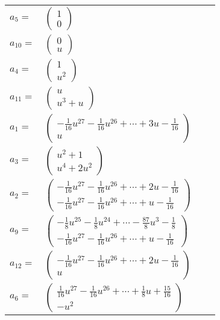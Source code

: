 \documentclass[1p]{elsarticle_modified}
\theoremstyle{definition}
\begin{document}
\begin{tabular}{m{7pt} m{180pt} m{7pt} m{180pt} }
\flushright $a_{5}=$&$\begin{pmatrix}1\\0\end{pmatrix}$ \\
\flushright $a_{10}=$&$\begin{pmatrix}0\\u\end{pmatrix}$ \\
\flushright $a_{4}=$&$\begin{pmatrix}1\\u^2\end{pmatrix}$ \\
\flushright $a_{11}=$&$\begin{pmatrix}u\\u^3+u\end{pmatrix}$ \\
\flushright $a_{1}=$&$\begin{pmatrix}-\frac{1}{16} u^{27}-\frac{1}{16} u^{26}+\cdots+3 u-\frac{1}{16}\\u\end{pmatrix}$ \\
\flushright $a_{3}=$&$\begin{pmatrix}u^2+1\\u^4+2 u^2\end{pmatrix}$ \\
\flushright $a_{2}=$&$\begin{pmatrix}-\frac{1}{16} u^{27}-\frac{1}{16} u^{26}+\cdots+2 u-\frac{1}{16}\\-\frac{1}{16} u^{27}-\frac{1}{16} u^{26}+\cdots+u-\frac{1}{16}\end{pmatrix}$ \\
\flushright $a_{9}=$&$\begin{pmatrix}-\frac{1}{8} u^{25}-\frac{1}{8} u^{24}+\cdots-\frac{87}{8} u^3-\frac{1}{8}\\-\frac{1}{16} u^{27}-\frac{1}{16} u^{26}+\cdots+u-\frac{1}{16}\end{pmatrix}$ \\
\flushright $a_{12}=$&$\begin{pmatrix}-\frac{1}{16} u^{27}-\frac{1}{16} u^{26}+\cdots+2 u-\frac{1}{16}\\u\end{pmatrix}$ \\
\flushright $a_{6}=$&$\begin{pmatrix}\frac{1}{16} u^{27}-\frac{1}{16} u^{26}+\cdots+\frac{1}{8} u+\frac{15}{16}\\- u^2\end{pmatrix}$ \\

\end{tabular}
\end{document}
